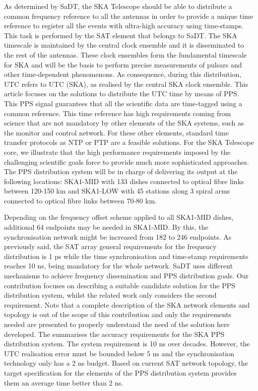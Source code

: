 As determined by SaDT, the SKA Telescope should be able to distribute a common frequency reference to all the antennas in order to provide a unique time reference to register all the events with ultra-high accuracy using time-stamps. This task is performed by the SAT element that belongs to SaDT. The SKA timescale is maintained by the central clock ensemble and it is disseminated to the rest of the antennas. These clock ensembles form the fundamental timescale for SKA and will be the basis to perform precise measurements of pulsars and other time-dependent phenomenons. As consequence,
during this distribution, UTC refers to UTC (SKA), as realised by the central
SKA clock ensemble.  This article focuses on the solutions to distribute
the UTC time by means of PPS. This PPS signal guarantees that all the
scientific data are time-tagged using a common reference. This time reference has high requirements coming from science that are not mandatory by other elements of the SKA systems, such as the monitor and control network. For these other elements, standard time transfer protocols as NTP or PTP are a feasible solutions. For the SKA Telescope core, we illustrate that the high performance
requirements imposed by the challenging scientific goals force to provide much
more sophisticated approaches.  The PPS distribution system will be in charge
of delivering its output at the following locations: SKA1-MID with 133 dishes
connected to optical fibre links between 120-150 km and SKA1-LOW with 45
stations along 3 spiral arms connected to optical fibre links between 70-80 km.

Depending on the frequency offset scheme applied to all SKA1-MID dishes,
additional 64 endpoints may be needed in SKA1-MID. By this, the synchronisation
network might be increased from 182 to 246 endpoints.  
As previously said, the SAT array general requirements for the frequency distribution is 1 ps 
while the time synchronisation and time-stamp requirements reaches 10 ns, being mandatory for the whole network.
SaDT uses different mechanisms to achieve frequency dissemination and PPS distribution goals. 
Our contribution  focuses on describing a  suitable candidate solution for the PPS distribution system, whilst the related work only considers the second requirement. Note that a complete description of the SKA network elements and topology is out of the scope of this contribution and only the requirements needed are presented to properly understand the need of the solution here developed. The \cite{paultests} summarises the accuracy requirements for the SKA PPS distribution system. The system requirement is 10 ns over decades. However, the UTC realisation error must be bounded below 5 ns and the synchronisation technology only has a 2 ns budget.
Based on current SAT network topology, the target specification for the elements of the PPS distribution system provides them an average time better than 2 ns.

